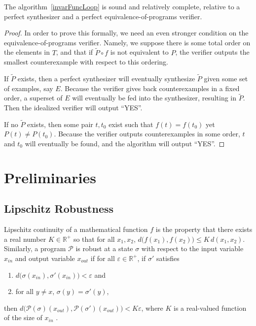\documentclass{llncs}
\begin{document}
  \begin{theorem}
    The algorithm~\ref{invarFuncLoop} is sound and relatively complete,
    relative to a perfect synthesizer and a perfect equivalence-of-programs
    verifier.
  \end{theorem}
  \begin{proof}
    In order to prove this formally, we need an even stronger condition on the
    equivalence-of-programs verifier.
    Namely, we suppose there is some total order on the elements in $T$,
    and that if $\widetilde{P}\circ f$ is not equivalent to $P$,
    the verifier outputs the smallest counterexample with respect to this
    ordering.

    If $\widetilde{P}$ exists, then a perfect synthesizer will eventually
    synthesize $\widetilde{P}$ given some set of examples, say $E$.
    Because the verifier gives back counterexamples in a fixed order,
    a superset of $E$ will eventually be fed into the synthesizer,
    resulting in $\widetilde{P}$.
    Then the idealized verifier will output ``YES''.

    If no $\widetilde{P}$ exists, then some pair $t, t_0$ exist
    such that $f(t)=f(t_0)$ yet $P(t)\ne P(t_0)$.
    Because the verifier outputs counterexamples in some order,
    $t$ and $t_0$ will eventually be found, and the algorithm will output ``YES''.
  \end{proof}

%
%




\appendix

\section{Preliminaries}

\subsection{Lipschitz Robustness}

Lipschitz continuity of a mathematical function \(f\) is the property that there
exists a real number \(K \in \mathbb{R}^{+}\) so that for all \(x_{1}, x_{2}\),
\(d\big(f(x_{1}), f(x_{2})\big) \leq K\,d(x_{1}, x_{2})\).  Similarly, a program
\(\mathcal{P}\) is robust at a state \(\sigma\)  with respect to the input
variable \(x_{in}\) and output variable \(x_{out}\) if for all \(\varepsilon \in
\mathbb{R}^{+}\), if \(\sigma'\) satisfies
\begin{enumerate}
    \item \(d\big(\sigma(x_{in}), \sigma'(x_{in})\big) < \varepsilon\) and
    \item for all \(y \not= x\), \(\sigma(y) = \sigma'(y)\),
\end{enumerate}
then \(d\big(\mathcal{P}(\sigma)(x_{out}), \mathcal{P}(\sigma')(x_{out})\big) <
K\varepsilon\), where \(K\) is a real-valued function of the size of \(x_{in}\)
\cite{chaudhuri11}.
\end{document}
